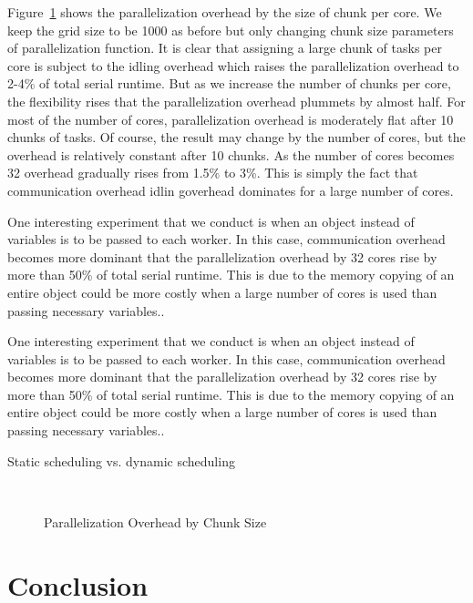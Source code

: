 \documentclass[12pt]{article}
\begin{document}
Figure~\ref{fig:po_chunk} shows the parallelization overhead by the size of chunk per core. We keep the grid size to be 1000 as before but only changing chunk size parameters of parallelization function. It is clear that assigning a large chunk of tasks per core is subject to the idling overhead which raises the parallelization overhead to 2-4\% of total serial runtime. But as we increase the number of chunks per core, the flexibility rises that the parallelization overhead plummets by almost half. For most of the number of cores, parallelization overhead is moderately flat after 10 chunks of tasks. Of course, the result may change by the number of cores, but the overhead is relatively constant after 10 chunks. As the number of cores becomes 32 overhead gradually rises from 1.5\% to 3\%. This is simply the fact that  communication overhead idlin goverhead dominates for a large number of cores.

One interesting experiment that we conduct is when an object instead of variables is to be passed to each worker. In this case, communication overhead becomes more dominant that the parallelization overhead by 32 cores rise by more than 50\% of total serial runtime. This is due to the memory copying of an entire object could be more costly when a large number of cores is used than passing necessary variables..

One interesting experiment that we conduct is when an object instead of variables is to be passed to each worker. In this case, communication overhead becomes more dominant that the parallelization overhead by 32 cores rise by more than 50\% of total serial runtime. This is due to the memory copying of an entire object could be more costly when a large number of cores is used than passing necessary variables..

Static scheduling vs. dynamic scheduling


\begin{figure}[h!]\label{fig:po_chunk}
\sf
\begin{center}
\caption{\sf Parallelization Overhead by Chunk Size}
\\
\end{center}
\end{figure}


\section{Conclusion}
\end{document}
